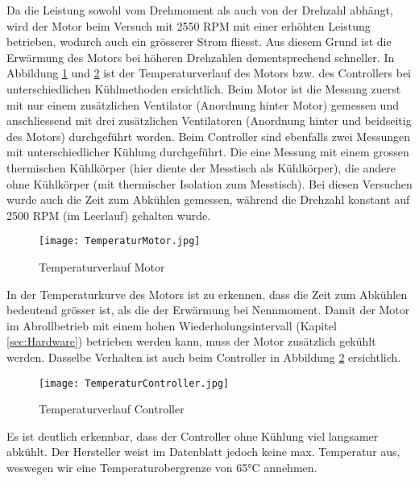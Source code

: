 Da die Leistung sowohl vom Drehmoment als auch von der Drehzahl abhängt, wird  der Motor beim Versuch mit 2550 RPM mit einer erhöhten Leistung betrieben, wodurch auch ein grösserer Strom fliesst. Aus diesem Grund ist die Erwärmung des Motors bei höheren Drehzahlen dementsprechend schneller. In Abbildung \ref{fig:TemperaturMotor} und \ref{fig:TemperaturController} ist der Temperaturverlauf des Motors bzw. des Controllers bei unterschiedlichen Kühlmethoden ersichtlich. Beim Motor ist die Messung zuerst mit nur einem zusätzlichen Ventilator (Anordnung hinter Motor) gemessen und anschliessend mit drei zusätzlichen Ventilatoren (Anordnung hinter und beidseitig des Motors) durchgeführt worden. Beim Controller sind ebenfalls zwei Messungen mit unterschiedlicher Kühlung durchgeführt. Die eine Messung mit einem grossen thermischen Kühlkörper (hier diente der Messtisch als Kühlkörper), die andere ohne Kühlkörper (mit thermischer Isolation zum Messtisch). Bei diesen Versuchen wurde auch die Zeit zum Abkühlen gemessen, während die Drehzahl konstant auf 2500 RPM (im Leerlauf) gehalten wurde.


\begin{figure}[H]
	\centering
	\texttt{[image: TemperaturMotor.jpg]}
	\caption{Temperaturverlauf Motor}\label{fig:TemperaturMotor}
\end{figure}

In der Temperaturkurve des Motors ist zu erkennen, dass die Zeit zum Abkühlen bedeutend grösser ist, als die der Erwärmung bei Nennmoment. Damit der Motor im Abrollbetrieb mit einem hohen Wiederholungsintervall (Kapitel \ref{sec:Hardware}) betrieben werden kann, muss der Motor zusätzlich gekühlt werden. Dasselbe Verhalten ist auch beim Controller in Abbildung \ref{fig:TemperaturController} ersichtlich.

\begin{figure}[H]
	\centering
	\texttt{[image: TemperaturController.jpg]}
	\caption{Temperaturverlauf Controller}\label{fig:TemperaturController}
\end{figure}

Es ist deutlich erkennbar, dass der Controller ohne Kühlung viel langsamer abkühlt. Der Hersteller weist im Datenblatt \cite{ControllerUserGuide} jedoch keine max. Temperatur aus, weswegen wir eine Temperaturobergrenze von 65°C annehmen.